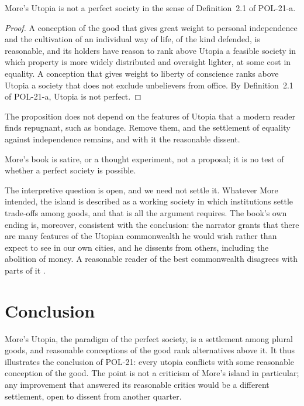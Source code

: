 \documentclass{situationist-preprint}
\begin{document}
\begin{proposition}\label{p:utopia}
More's Utopia is not a perfect society in the sense of Definition~2.1 of POL-21-a.
\end{proposition}

\begin{proof}
A conception of the good that gives great weight to personal independence and the cultivation of an individual way of life, of the kind \citet{Mill1859} defended, is reasonable, and its holders have reason to rank above Utopia a feasible society in which property is more widely distributed and oversight lighter, at some cost in equality. A conception that gives weight to liberty of conscience ranks above Utopia a society that does not exclude unbelievers from office. By Definition~2.1 of POL-21-a, Utopia is not perfect.
\end{proof}

The proposition does not depend on the features of Utopia that a modern reader finds repugnant, such as bondage. Remove them, and the settlement of equality against independence remains, and with it the reasonable dissent.

\begin{objection}
More's book is satire, or a thought experiment, not a proposal; it is no test of whether a perfect society is possible.
\end{objection}

\begin{reply}
The interpretive question is open, and we need not settle it. Whatever More intended, the island is described as a working society in which institutions settle trade-offs among goods, and that is all the argument requires. The book's own ending is, moreover, consistent with the conclusion: the narrator grants that there are many features of the Utopian commonwealth he would wish rather than expect to see in our own cities, and he dissents from others, including the abolition of money. A reasonable reader of the best commonwealth disagrees with parts of it \citep{Logan1983}.
\end{reply}

\section{Conclusion}

More's Utopia, the paradigm of the perfect society, is a settlement among plural goods, and reasonable conceptions of the good rank alternatives above it. It thus illustrates the conclusion of POL-21: every utopia conflicts with some reasonable conception of the good. The point is not a criticism of More's island in particular; any improvement that answered its reasonable critics would be a different settlement, open to dissent from another quarter.
\end{document}

